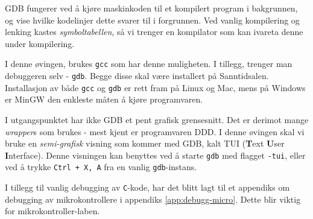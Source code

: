 \begin{alphasection}
GDB fungerer ved å kjøre maskinkoden til et kompilert program i bakgrunnen, og vise hvilke kodelinjer dette svarer til i forgrunnen. Ved vanlig kompilering og lenking kastes \textit{symboltabellen}, så vi trenger en kompilator som kan ivareta denne under kompilering.

I denne øvingen, brukes \verb|gcc| som har denne muligheten. I tillegg, trenger man debuggeren selv - \verb|gdb|. Begge disse skal være installert på Sanntidsalen. Installasjon av både \verb|gcc| og \verb|gdb| er rett fram på Linux og Mac, mens på Windows er MinGW den enkleste måten å kjøre programvaren.

I utgangspunktet har ikke GDB et pent grafisk grensesnitt. Det er derimot mange \textit{wrapper}s som brukes - mest kjent er programvaren DDD. I denne øvingen skal vi bruke en \textit{semi-grafisk} visning som kommer med GDB, kalt TUI (\textbf{T}ext \textbf{U}ser \textbf{I}nterface). Denne visningen kan benyttes ved å starte \verb|gdb| med flagget \verb|-tui|, eller ved å trykke \verb|Ctrl + X, A| fra en vanlig \verb|gdb|-instans.


I tillegg til vanlig debugging av \verb|C|-kode, har det blitt lagt til et appendiks om debugging av mikrokontrollere i appendiks \ref{app:debugg-micro}. Dette blir viktig for mikrokontroller-laben.






\end{alphasection}

\setcounter{section}{0}